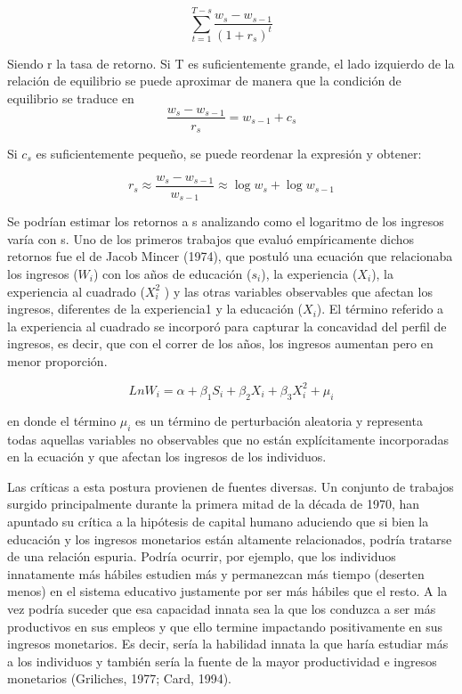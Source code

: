\documentclass[a4paper]{article}
\theoremstyle{plain}
\theoremstyle{definition}
\begin{document}
\begin{equation*}
    \sum^{T-s}_{t=1} \frac{w_s-w_{s-1}}{(1+r_s)^t}
\end{equation*}

Siendo r la tasa de retorno. Si T es suficientemente grande, el lado izquierdo de la relación de equilibrio se puede aproximar de manera que la condición de equilibrio se traduce en
\begin{equation*}
 \frac{w_s-w_{s-1}}{r_s}=w_{s-1}+c_s
\end{equation*}

Si $c_s$ es suficientemente pequeño, se puede reordenar la expresión y obtener:

\begin{equation*}
 r_s \approx \frac{w_s-w_{s-1}}{w_{s-1}}\approx \log w_{s}+\log w_{s-1}
\end{equation*}

Se podrían estimar los retornos a s analizando como el logaritmo de los ingresos varía con s. Uno de los primeros trabajos que evaluó empíricamente dichos retornos fue el de Jacob Mincer (1974), que postuló una ecuación que relacionaba los ingresos ($W_i$) con
los años de educación ($s_i$), la experiencia ($X_i$), la experiencia al cuadrado ($X_i^2$ ) y las otras
variables observables que afectan los ingresos, diferentes de la experiencia1 y la educación ($X_i$). El término referido a la experiencia al cuadrado se incorporó para capturar la concavidad del perfil de ingresos, es decir, que con el correr de los años, los ingresos aumentan pero en menor proporción.

\begin{equation*}
    LnW_i=\alpha+\beta_1S_i+\beta_2X_i+ \beta_3X^2_i+\mu_i
\end{equation*}

en donde el término $\mu_i$ es un término de perturbación aleatoria y representa todas aquellas variables no observables que no están explícitamente incorporadas en la ecuación y que afectan los ingresos de los individuos. 

Las críticas a esta postura provienen de fuentes diversas. Un conjunto de trabajos surgido principalmente durante la primera mitad de la década de 1970, han apuntado su crítica a la hipótesis de capital humano aduciendo que si bien la educación y los ingresos monetarios están altamente relacionados, podría tratarse de una relación espuria. Podría ocurrir, por ejemplo, que los individuos innatamente más hábiles estudien más y permanezcan más tiempo (deserten menos) en el sistema educativo justamente por ser más hábiles que el resto. A la vez podría suceder que esa capacidad innata sea la que los conduzca a ser más productivos en sus empleos y que ello termine impactando positivamente en sus ingresos monetarios. Es decir, sería la habilidad innata la que haría estudiar más a los individuos y también sería la fuente de la mayor productividad e ingresos monetarios (Griliches, 1977; Card, 1994).
\end{document}
